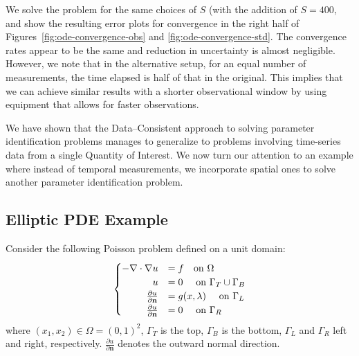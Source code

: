 We solve the problem for the same choices of $S$ (with the addition of $S=400$, and show the resulting error plots for convergence in the right half of Figures~\ref{fig:ode-convergence-obs} and \ref{fig:ode-convergence-std}.
The convergence rates appear to be the same and reduction in uncertainty is almost negligible.
However, we note that in the alternative setup, for an equal number of measurements, the time elapsed is half of that in the original.
This implies that we can achieve similar results with a shorter observational window by using equipment that allows for faster observations.

We have shown that the Data--Consistent approach to solving parameter identification problems manages to generalize to problems involving time-series data from a single Quantity of Interest.
We now turn our attention to an example where instead of temporal measurements, we incorporate spatial ones to solve another parameter identification problem.




\subsection{Elliptic PDE Example}\label{subsec:pde-example}

Consider the following Poisson problem defined on a unit domain:
\begin{equation}\label{eq:pde-equation}
\begin{cases}
\hfill -\nabla \cdot \nabla u &= f \quad\text{on } \Omega \\
\hfill u &= 0 \quad\text{ on } \Gamma_T \cup \Gamma_B \\
\hfill \frac{\partial u}{\partial \mathbf{n}} &= g(x,\param) \quad\text{ on } \Gamma_L \\
\hfill \frac{\partial u}{\partial \mathbf{n}} &= 0 \quad\text{ on } \Gamma_R
\end{cases}
\end{equation}
where $(x_1, x_2) \in \Omega = (0,1)^2$, $\Gamma_T$ is the top, $\Gamma_B$ is the bottom, $\Gamma_L$ and $\Gamma_R$ left and right, respectively.
$\frac{\partial u}{\partial \mathbf{n}}$ denotes the outward normal direction.


